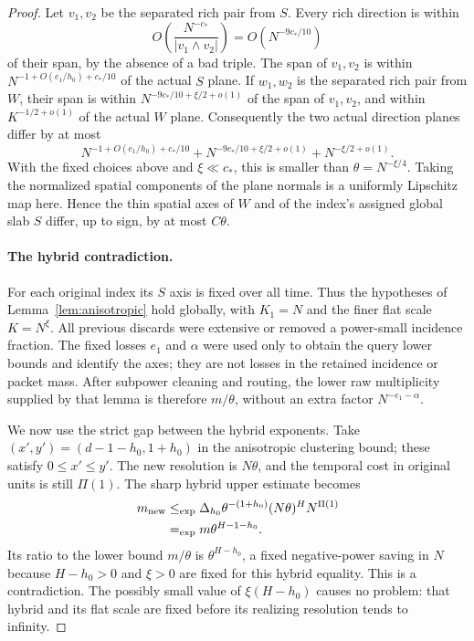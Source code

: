 \begin{proof}
Let $v_1,v_2$ be the separated rich pair from $S$.
Every rich direction is within
\[
 O\!\left(\frac{N^{-c_*}}{|v_1\wedge v_2|}\right)=O(N^{-9c_*/10})
\]
of their span,
by the absence of a bad triple.  The span of $v_1,v_2$ is within
$N^{-1+O(e_1/h_0)+c_*/10}$ of the actual $S$ plane.
If $w_1,w_2$ is the separated rich pair from $W$, their span is
within $N^{-9c_*/10+\xi/2+o(1)}$ of the span of $v_1,v_2$,
and within $K^{-1/2+o(1)}$ of the actual $W$ plane.
Consequently the two actual direction planes differ by at most
\begin{equation}
 N^{-1+O(e_1/h_0)+c_*/10}
 +N^{-9c_*/10+\xi/2+o(1)}
 +N^{-\xi/2+o(1)}.
 \label{loc:axis-error}
\end{equation}
With the fixed choices above and $\xi\ll c_*$, this is smaller
than $\theta=N^{-\xi/4}$.  Taking the normalized spatial
components of the plane normals is a uniformly Lipschitz map
here.  Hence the thin spatial axes of $W$ and of the index's
assigned global slab $S$ differ, up to sign, by at most $C\theta$.

\paragraph{The hybrid contradiction.}
For each original index its $S$ axis is fixed over all time.
Thus the hypotheses of Lemma~\ref{lem:anisotropic} hold globally,
with $K_1=N$ and the finer flat scale $K=N^\xi$.
All previous discards were extensive or removed a power-small
incidence fraction.  The fixed losses $e_1$ and $\alpha$ were
used only to obtain the query lower bounds and identify the
axes; they are not losses in the retained incidence or packet
mass.  After subpower cleaning and routing, the lower raw
multiplicity supplied by that lemma is therefore $m/\theta$,
without an extra factor $N^{-e_1-\alpha}$.

We now use the strict gap between the hybrid exponents.  Take
$(x',y')=(d-1-h_0,1+h_0)$ in the anisotropic clustering bound; these
satisfy $0\leq x'\leq y'$.  The new resolution is
$N\theta$, and the temporal cost in original units is still
$\Pi(1)$.  The sharp hybrid upper estimate becomes
\begin{align}
 m_{\mathrm{new}}
 &\mathrel{\leq_{\mathrm{exp}}}\Delta_{h_0}\theta^{-(1+h_0)}
                  (N\theta)^H N^{\Pi(1)}\notag\\
 &\mathrel{=_{\mathrm{exp}}} m\theta^{H-1-h_0}.
 \label{loc:hybrid-anisotropic-upper}
\end{align}
Its ratio to the lower bound $m/\theta$ is
$\theta^{H-h_0}$, a fixed negative-power saving in $N$ because
$H-h_0>0$ and $\xi>0$ are fixed for this hybrid equality.
This is a contradiction.  The possibly small value of
$\xi(H-h_0)$ causes no problem: that hybrid and its flat scale
are fixed before its realizing resolution tends to infinity.


\end{proof}
